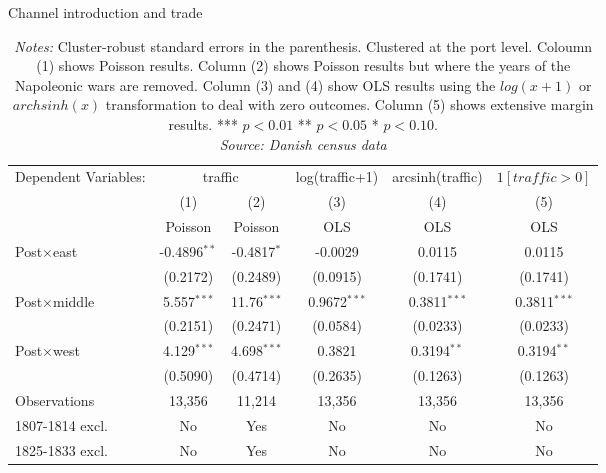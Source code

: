 \begin{table}
\centering
\caption{Channel introduction and trade} \label{tab:reg_trade}
\begin{tabular}{lccccc}
   \tabularnewline \midrule \midrule
   Dependent Variables: & \multicolumn{2}{c}{traffic}     & log(traffic+1)  & arcsinh(traffic)  & $1[traffic>0]$\\
                        & (1)            & (2)            & (3)             & (4)             & (5)\\  
                        & Poisson        & Poisson        & OLS             & OLS             & OLS\\  
   \midrule
   Post$\times$east     & -0.4896$^{**}$ & -0.4817$^{*}$  & -0.0029         & 0.0115          & 0.0115\\   
                        & (0.2172)       & (0.2489)       & (0.0915)        & (0.1741)        & (0.1741)\\   
   Post$\times$middle   & 5.557$^{***}$  & 11.76$^{***}$  & 0.9672$^{***}$  & 0.3811$^{***}$  & 0.3811$^{***}$\\   
                        & (0.2151)       & (0.2471)       & (0.0584)        & (0.0233)        & (0.0233)\\   
   Post$\times$west     & 4.129$^{***}$  & 4.698$^{***}$  & 0.3821          & 0.3194$^{**}$   & 0.3194$^{**}$\\   
                        & (0.5090)       & (0.4714)       & (0.2635)        & (0.1263)        & (0.1263)\\   
   \midrule
   Observations         & 13,356         & 11,214         & 13,356          & 13,356          & 13,356\\  
   \midrule
   1807-1814 excl.      & No             & Yes            & No              & No              & No\\
   1825-1833 excl.      & No             & Yes            & No              & No              & No\\
   \midrule \midrule
\end{tabular}
\parbox{0.9\textwidth}{
\caption*{\textit{Notes:} Cluster-robust standard errors in the parenthesis. Clustered at the port level. Coloumn (1) shows Poisson results. Column (2) shows Poisson results but where the years of the Napoleonic wars are removed. Column (3) and (4) show OLS results using the $log(x+1)$ or $archsinh(x)$ transformation to deal with zero outcomes. Column (5) shows extensive margin results. *** $p< 0.01$ ** $p< 0.05$ * $p< 0.10$. \\ \textit{Source: Danish census data}}
}
\end{table}

